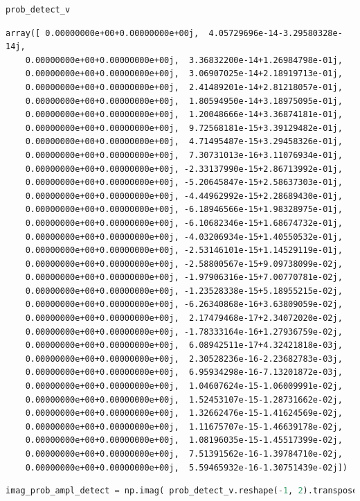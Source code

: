 \begin{lstlisting}[language=Python]
prob_detect_v
\end{lstlisting}
\begin{lstlisting}[basicstyle=\tiny\ttfamily]
    array([ 0.00000000e+00+0.00000000e+00j,  4.05729696e-14-3.29580328e-14j,
    0.00000000e+00+0.00000000e+00j,  3.36832200e-14+1.26984798e-01j,
    0.00000000e+00+0.00000000e+00j,  3.06907025e-14+2.18919713e-01j,
    0.00000000e+00+0.00000000e+00j,  2.41489201e-14+2.81218057e-01j,
    0.00000000e+00+0.00000000e+00j,  1.80594950e-14+3.18975095e-01j,
    0.00000000e+00+0.00000000e+00j,  1.20048666e-14+3.36874181e-01j,
    0.00000000e+00+0.00000000e+00j,  9.72568181e-15+3.39129482e-01j,
    0.00000000e+00+0.00000000e+00j,  4.71495487e-15+3.29458326e-01j,
    0.00000000e+00+0.00000000e+00j,  7.30731013e-16+3.11076934e-01j,
    0.00000000e+00+0.00000000e+00j, -2.33137990e-15+2.86713992e-01j,
    0.00000000e+00+0.00000000e+00j, -5.20645847e-15+2.58637303e-01j,
    0.00000000e+00+0.00000000e+00j, -4.44962992e-15+2.28689430e-01j,
    0.00000000e+00+0.00000000e+00j, -6.18946566e-15+1.98328975e-01j,
    0.00000000e+00+0.00000000e+00j, -6.10682346e-15+1.68674732e-01j,
    0.00000000e+00+0.00000000e+00j, -4.03206934e-15+1.40550532e-01j,
    0.00000000e+00+0.00000000e+00j, -2.53146101e-15+1.14529119e-01j,
    0.00000000e+00+0.00000000e+00j, -2.58800567e-15+9.09738099e-02j,
    0.00000000e+00+0.00000000e+00j, -1.97906316e-15+7.00770781e-02j,
    0.00000000e+00+0.00000000e+00j, -1.23528338e-15+5.18955215e-02j,
    0.00000000e+00+0.00000000e+00j, -6.26340868e-16+3.63809059e-02j,
    0.00000000e+00+0.00000000e+00j,  2.17479468e-17+2.34072020e-02j,
    0.00000000e+00+0.00000000e+00j, -1.78333164e-16+1.27936759e-02j,
    0.00000000e+00+0.00000000e+00j,  6.08942511e-17+4.32421818e-03j,
    0.00000000e+00+0.00000000e+00j,  2.30528236e-16-2.23682783e-03j,
    0.00000000e+00+0.00000000e+00j,  6.95934298e-16-7.13201872e-03j,
    0.00000000e+00+0.00000000e+00j,  1.04607624e-15-1.06009991e-02j,
    0.00000000e+00+0.00000000e+00j,  1.52453107e-15-1.28731662e-02j,
    0.00000000e+00+0.00000000e+00j,  1.32662476e-15-1.41624569e-02j,
    0.00000000e+00+0.00000000e+00j,  1.11675707e-15-1.46639178e-02j,
    0.00000000e+00+0.00000000e+00j,  1.08196035e-15-1.45517399e-02j,
    0.00000000e+00+0.00000000e+00j,  7.51391562e-16-1.39784710e-02j,
    0.00000000e+00+0.00000000e+00j,  5.59465932e-16-1.30751439e-02j])
\end{lstlisting}

\begin{lstlisting}[language=Python]
imag_prob_ampl_detect = np.imag( prob_detect_v.reshape(-1, 2).transpose()[1] )
\end{lstlisting}

